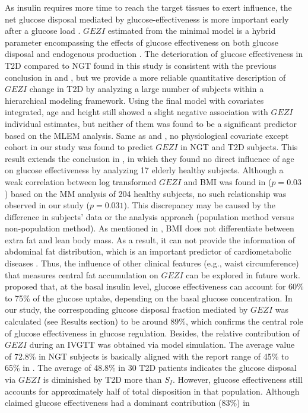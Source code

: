 \documentclass[utf8]{frontiersSCNS} %
\begin{document}
As insulin requires more time to reach the target tissues to exert influence, the net glucose disposal mediated by glucose-effectiveness is more important early after a glucose load \citep{Best1996}. $GEZI$ estimated from the minimal model is a hybrid parameter encompassing the effects of glucose effectiveness on both glucose disposal and endogenous production \citep{Vicini1999}. The deterioration of glucose effectiveness in T2D compared to NGT found in this study is consistent with the previous conclusion in \citet{welch_1990} and \citet{ataru_1992}, but we provide a more reliable quantitative description of $GEZI$ change in T2D by analyzing a large number of subjects within a hierarchical modeling framework. Using the final model with covariates integrated, age and height still showed a slight negative association with $GEZI$ individual estimates, but neither of them was found to be a significant predictor based on the MLEM analysis. Same as \citet{Denti2010} and \citet{hoffman_2000}, no physiological covariate except cohort in our study was found to predict $GEZI$ in NGT and T2D subjects. This result extends the conclusion in \citet{pacini_1998}, in which they found no direct influence of age on glucose effectiveness by analyzing 17 elderly healthy subjects. Although a weak correlation between log transformed $GEZI$ and BMI was found in \citet{Morettini_2019} ($p=0.03$) based on the MM analysis of 204 healthy subjects, no such relationship was observed in our study ($p=0.031$). This discrepancy may be caused by the difference in subjects' data or the analysis approach (population method versus non-population method). As mentioned in \citet{Morettini_2019}, BMI does not differentiate between extra fat and lean body mass. As a result, it can not provide the information of abdominal fat distribution, which is an important predictor of cardiometabolic diseases \citep{Klein_2007}. Thus, the influence of other clinical features (e.g., waist circumference) that measures central fat accumulation on $GEZI$ can be explored in future work. \citet{Best1996} proposed that, at the basal insulin level, glucose effectiveness can account for 60\% to 75\% of the glucose uptake, depending on the basal glucose concentration. In our study, the corresponding glucose disposal fraction mediated by $GEZI$ was calculated (see Results section) to be around 89\%, which confirms the central role of glucose effectiveness in glucose regulation. Besides, the relative contribution of $GEZI$ during an IVGTT was obtained via model simulation. The average value of 72.8\% in NGT subjects is basically aligned with the report range of 45\% to 65\% in \citet{Alford_2018}. The average of 48.8\% in 30 T2D patients indicates the glucose disposal via $GEZI$ is diminished by T2D more than $S_I$. However, glucose effectiveness still accounts for approximately half of total disposition in that population. Although \citet{Best1996} claimed glucose effectiveness had a dominant contribution (83\%) in 
\end{document}
